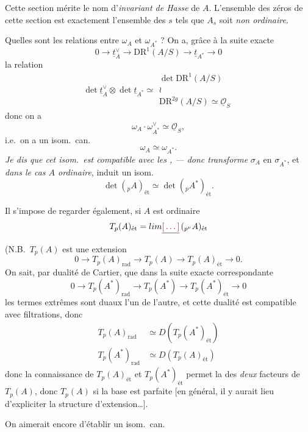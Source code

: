 \documentclass[11pt,a4paper]{article}
\begin{document}

Cette section mérite le nom d'\emph{invariant de Hasse} de $A$. L'ensemble des
zéros de cette section est exactement l'ensemble des $s$ tels que $A_s$ soit
\emph{non ordinaire}.

Quelles sont les relations entre $\omega_A$ et $\omega_{A^*}$ ? On a, grâce à
la suite exacte
\[
0 \to \underline{t}_A^{\vee} \to \mathrm{DR}^1(A/S) \to \underline{t}_{A^*} \to 0
\]
la relation
\[
\det \underline{t}_A^{\vee} \otimes \det \underline{t}_{A^*} \simeq
\begin{array}{c}
\det \mathrm{DR}^1(A/S) \\
\wr \\
\mathrm{DR}^{2g}(A/S) \simeq \underline{\mathcal{O}}_S
\end{array}
\]
donc on a
\[
\omega_A \cdot \omega_{A^*}^{\vee} \simeq \underline{\mathcal{O}}_S ,
\]
i.e.\ on a un isom.\ can.
\[
\omega_A \simeq \omega_{A^*} .
\]
\emph{Je dis que cet isom.\ est compatible avec les
, — donc transforme} $\sigma_A$ en
$\sigma_{A^*}$, et \emph{dans le cas $A$ ordinaire}, induit un isom.
\[
\det({}_{p}A)_{\text{ét}} \simeq \det({}_{p}A^*)_{\text{ét}} .
\]


Il s'impose de regarder également, si $A$ est ordinaire
\[
T_p(A)_{\text{ét}} = \varprojlim \struck{\ill{}}\, ({}_{p^{\nu}}A)_{\text{ét}}
\]
(N.B.\ $T_p(A)$ est une extension
\[
0 \to T_p(A)_{\mathrm{rad}} \to T_p(A) \to T_p(A)_{\text{ét}} \to 0 .
\]
On sait, par dualité de Cartier, que dans la suite exacte correspondante
\[
0 \to T_p(A^*)_{\mathrm{rad}} \to T_p(A^*) \to T_p(A^*)_{\text{ét}} \to 0
\]
les termes extrêmes sont duaux l'un de l'autre, et 
cette dualité est compatible avec filtrations, donc
\[
\begin{aligned}
T_p(A)_{\mathrm{rad}} &\simeq D(T_p(A^*)_{\text{ét}}) \\
T_p(A^*)_{\mathrm{rad}} &\simeq D(T_p(A)_{\text{ét}})
\end{aligned}
\]
donc la connaissance de $T_p(A)_{\text{ét}}$ et $T_p(A^*)_{\text{ét}}$ permet
la \ill{} des \emph{deux} facteurs de $T_p(A)$, donc $T_p(A)$ si la base est
parfaite [en général, il y aurait lieu d'expliciter la structure
d'extension\ldots].

On aimerait encore d'établir un isom.\ can.\ 
\end{document}
